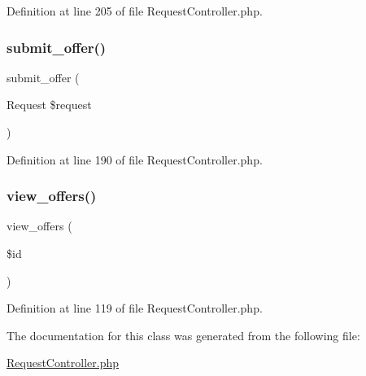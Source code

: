 Definition at line 205 of file Request\+Controller.\+php.

\mbox{\label{class_responsive_1_1_http_1_1_controllers_1_1_request_controller_a634b653af2d0d7fb3b69cdb49c8d0bf3}} 
\subsubsection{\texorpdfstring{submit\_offer()}{submit\_offer()}}
{\footnotesize\ttfamily submit\+\_\+offer (\begin{DoxyParamCaption}\item[{Request}]{\$request }\end{DoxyParamCaption})\hspace{0.3cm}{\ttfamily [protected]}}



Definition at line 190 of file Request\+Controller.\+php.

\mbox{\label{class_responsive_1_1_http_1_1_controllers_1_1_request_controller_aef7a6634a13655f15077aece970d9f1c}} 
\subsubsection{\texorpdfstring{view\_offers()}{view\_offers()}}
{\footnotesize\ttfamily view\+\_\+offers (\begin{DoxyParamCaption}\item[{}]{\$id }\end{DoxyParamCaption})}



Definition at line 119 of file Request\+Controller.\+php.



The documentation for this class was generated from the following file\+:\begin{DoxyCompactItemize}
\item 
\mbox{\hyperlink{_request_controller_8php}{Request\+Controller.\+php}}\end{DoxyCompactItemize}
